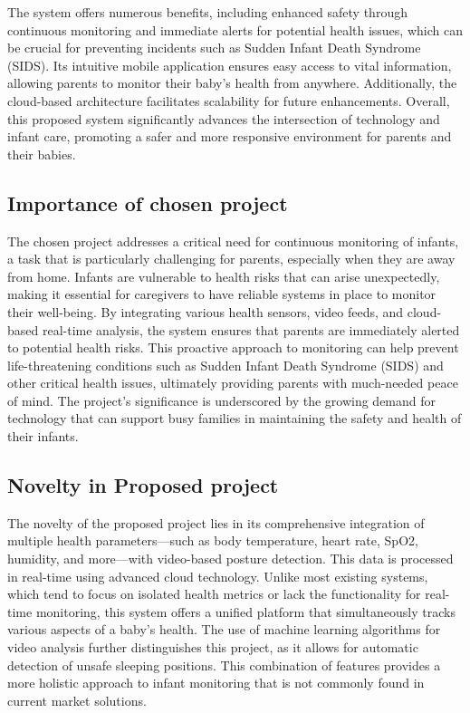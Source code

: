 \documentclass[12pt,a4paper]{report}
\begin{document}
  The system offers numerous benefits, including enhanced safety through continuous monitoring and immediate alerts for potential health issues, which can be crucial for preventing incidents such as Sudden Infant Death Syndrome (SIDS). Its intuitive mobile application ensures easy access to vital information, allowing parents to monitor their baby’s health from anywhere. Additionally, the cloud-based architecture facilitates scalability for future enhancements. Overall, this proposed system significantly advances the intersection of technology and infant care, promoting a safer and more responsive environment for parents and their babies.
  
  \subsection{Importance of chosen project}
  The chosen project addresses a critical need for continuous monitoring of infants, a task that is particularly challenging for parents, especially when they are away from home. Infants are vulnerable to health risks that can arise unexpectedly, making it essential for caregivers to have reliable systems in place to monitor their well-being. By integrating various health sensors, video feeds, and cloud-based real-time analysis, the system ensures that parents are immediately alerted to potential health risks. This proactive approach to monitoring can help prevent life-threatening conditions such as Sudden Infant Death Syndrome (SIDS) and other critical health issues, ultimately providing parents with much-needed peace of mind. The project's significance is underscored by the growing demand for technology that can support busy families in maintaining the safety and health of their infants.
  \subsection{Novelty in Proposed project}
  The novelty of the proposed project lies in its comprehensive integration of multiple health parameters—such as body temperature, heart rate, SpO2, humidity, and more—with video-based posture detection. This data is processed in real-time using advanced cloud technology. Unlike most existing systems, which tend to focus on isolated health metrics or lack the functionality for real-time monitoring, this system offers a unified platform that simultaneously tracks various aspects of a baby’s health. The use of machine learning algorithms for video analysis further distinguishes this project, as it allows for automatic detection of unsafe sleeping positions. This combination of features provides a more holistic approach to infant monitoring that is not commonly found in current market solutions.
\end{document}
